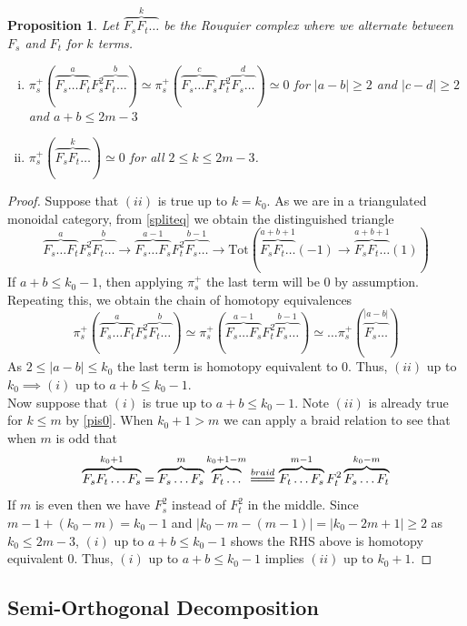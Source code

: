 \documentclass[10pt]{article}
\numberwithin{theorem}{section}
\newtheorem{prop}[theorem]{Proposition}
\theoremstyle{definition}
\newcommand{\paren}[1]{\left( #1 \right)}
\newcommand{\xequals}[1]{\overset{#1}{=\joinrel=\joinrel=}}
\newcommand{\0}{\ \raisebox{-2ex}{\begin{tikzpicture}[xscale=0.25,yscale=0.3,thick,baseline]
 \draw (0,0) -- (0,3); 
\end{tikzpicture}}}
\renewcommand{\1}{\ \raisebox{-2ex}{\begin{tikzpicture}[xscale=0.25,yscale=0.3,thick,baseline]
 \draw (0,0) -- (0,1);
 \draw (0,2) -- (0,3);
 \node[dot] at (0,1) {};
  \node[dot] at (0,2) {};
\end{tikzpicture}}}
\begin{document}
\begin{prop}
\label{preprop}
Let $\overbrace{F_sF_t\ldots}^{k }$ be the Rouquier complex where we alternate between $F_s$ and $F_t$ for $k$ terms.
\begin{enumerate}[(i)]
    \item $\pi_s^+(\overbrace{F_s\ldots F_t}^{a }F_s^2\overbrace{F_t\ldots}^{b })\simeq \pi_s^+(\overbrace{F_s\ldots F_s}^{c }F_t^2\overbrace{F_s\ldots}^{d })\simeq 0$ for $|a-b|\ge 2$ and $|c- d|\ge 2$ and $a+b\le 2m-3$
    \item $\pi_s^+(\overbrace{F_sF_t\ldots}^{k })\simeq 0$ for all $2\le k \le 2m-3$.
\end{enumerate}
\end{prop}
\begin{proof}
Suppose that $(ii)$ is true up to $k=k_0$. As we are in a triangulated monoidal category, from \cref{spliteq} we obtain the distinguished triangle
\[ \overbrace{F_s\ldots F_t}^{a }F_s^2\overbrace{F_t\ldots}^{b }\to \overbrace{F_s\ldots F_s}^{a -1}F_t^2\overbrace{F_s\ldots}^{b -1}\to  \mathrm{Tot}\paren{\overbrace{F_sF_t\ldots}^{a+b+1 }(-1)\to\overbrace{F_sF_t\ldots}^{a+b+1 }(1) } \]
If $a+b\le k_0-1$, then applying $\pi_s^+$  the last term will be 0 by assumption. Repeating this, we obtain the chain of homotopy equivalences
\[ \pi_s^+\paren{  \overbrace{F_s\ldots F_t}^{a }F_s^2\overbrace{F_t\ldots}^{b }}\simeq \pi_s^+\paren{  \overbrace{F_s\ldots F_s}^{a-1 }F_t^2\overbrace{F_s\ldots}^{b -1}}\simeq \ldots \pi_s^+\paren{\overbrace{F_s\ldots}^{|a-b| }}  \]
As $2\le |a-b|\le k_0$ the last term is homotopy equivalent to 0. Thus,  $(ii)$ up to $k_0\implies (i)$ up to $a+b\le k_0-1$. \\

Now suppose that $(i)$ is true up to $a+b\le k_0-1$. Note $(ii)$ is already true for $k\le m$ by \cref{pis0}. When $k_0+1>m$ we can apply a braid relation to see that when $m$ is odd that
    \[ \overbrace{F_sF_t\ldots F_s}^{k_0+1 }=\overbrace{F_s\ldots F_s}^{m}\overbrace{F_t\ldots }^{k_0+1 -m}\xequals{braid}\overbrace{F_t\ldots F_s}^{m-1}F_t^2\overbrace{F_s\ldots F_t}^{k_0-m}   \]
    If $m$ is even then we have $F_s^2$ instead of $F_t^2$ in the middle. Since $m-1+(k_0-m)=k_0-1$ and $|k_0-m-(m-1)|=|k_0-2m+1|\ge 2$ as $k_0\le 2m-3$, $(i)$  up to $a+b\le k_0-1$ shows the RHS above is homotopy equivalent 0. Thus, $(i)$ up to $a+b\le k_0-1$ implies $(ii)$ up to $k_0+1$.
\end{proof}

\subsection{Semi-Orthogonal Decomposition}
\end{document}
